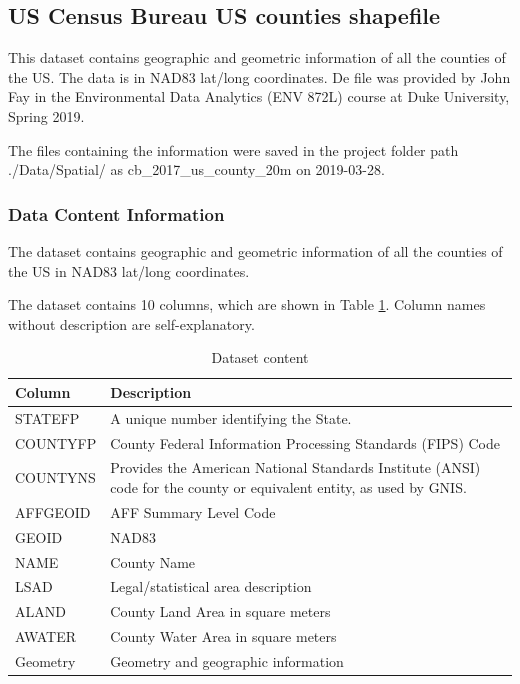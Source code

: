 \documentclass[12pt,]{article}
\begin{document}
\subsection{US Census Bureau US counties
shapefile}\label{us-census-bureau-us-counties-shapefile}

This dataset contains geographic and geometric information of all the
counties of the US. The data is in NAD83 lat/long coordinates. De file
was provided by John Fay in the Environmental Data Analytics (ENV 872L)
course at Duke University, Spring 2019.

The files containing the information were saved in the project folder
path ./Data/Spatial/ as cb\_2017\_us\_county\_20m on 2019-03-28.

\subsubsection{Data Content
Information}\label{data-content-information-3}

The dataset contains geographic and geometric information of all the
counties of the US in NAD83 lat/long coordinates.

The dataset contains 10 columns, which are shown in Table
\ref{tab:tab8}. Column names without description are self-explanatory.

\begin{table}[ht]
\centering
\begin{tabular}{p{2.5in}p{3.5in}}
  \hline
Column & Description \\ 
  \hline
STATEFP & A unique number identifying the State. \\ 
  COUNTYFP & County Federal Information Processing Standards (FIPS) Code \\ 
  COUNTYNS & Provides the American National Standards Institute (ANSI) code for the county or equivalent entity, as used by GNIS. \\ 
  AFFGEOID & AFF Summary Level Code \\ 
  GEOID & NAD83 \\ 
  NAME & County Name \\ 
  LSAD & Legal/statistical area description \\ 
  ALAND & County Land Area in square meters \\ 
  AWATER & County Water Area in square meters \\ 
  Geometry & Geometry and geographic information \\ 
   \hline
\end{tabular}
\caption{Dataset content} 
\label{tab:tab8}
\end{table}
\end{document}
